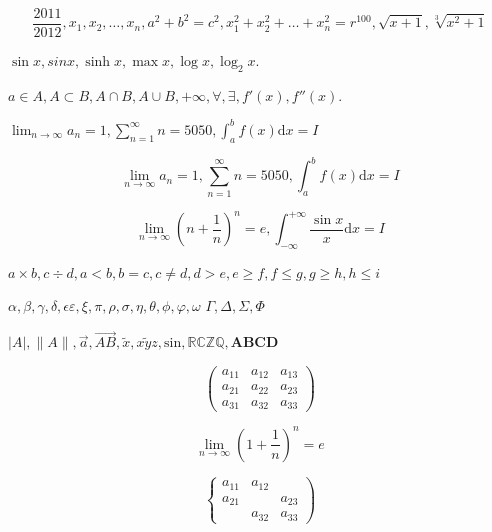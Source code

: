 \documentclass{article}
\begin{document}
    $$\frac{2011}{2012}, x_1,x_2,\ldots,x_n, a^2+b^2=c^2, x_1^2+x_2^2+\dots+x_n^2=r^{100}, \sqrt{x+1}, \sqrt[3]{x^2+1}$$

    $\sin x, sin x, \sinh x, \max x, \log x, \log_2 x.$

    $a \in A, A \subset B, A \cap B, A \cup B, +\infty, \forall, \exists, f'(x),f''(x).$

    $\lim_{n \to\infty} a_n = 1, \sum_{n=1}^{\infty} n = 5050, \int_{a}^{b}f(x) \mathrm{d} x = I$

    $$\lim_{n \to\infty} a_n = 1, \sum_{n=1}^{\infty} n = 5050, \int_{a}^{b}f(x) \mathrm{d} x = I$$

    $$\lim_{n \to \infty} (n + \frac{1}{n})^n = e, \int_{-\infty}^{+\infty} \frac{\sin x}{x} \mathrm{d} x = I$$

    $a \times b, c \div d, a < b, b = c, c \neq d, d > e, e \geq f, f \leq g, g \geqslant h, h \leqslant i$

    $ \alpha,\beta,\gamma,\delta, \epsilon \varepsilon, \xi, \pi,\rho, \sigma, \eta, \theta, \phi, \varphi, \omega$
    $\Gamma, \Delta, \Sigma, \Phi$

    $|A|, \|A\|, \vec{a}, \overrightarrow{AB}, \tilde{x}, \widetilde{xyz}, \mathrm{sin}, \mathbb{RCZQ}, \mathbf{ABCD}$

    \begin{equation} %
        \left(
        \begin{array}{ccc}
          a_{11} & a_{12} & a_{13} \\
          a_{21} & a_{22} & a_{23} \\
          a_{31} & a_{32} & a_{33}
        \end{array}
        \right)
    \end{equation}

    \begin{equation}
    \lim_{n \to \infty} \left( 1 + \frac{1}{n} \right)^n = e
    \end{equation}

    \begin{equation}
        \left\{
        \begin{array}{c||c|c}
          a_{11} & a_{12} & \\
          \hline
          a_{21} &  & a_{23} \\
           & a_{32} & a_{33}
        \end{array}
        \right)
    \end{equation}
\end{document}
